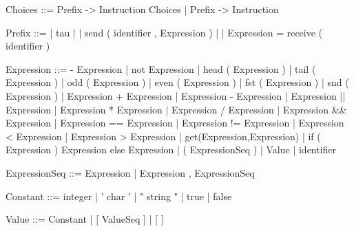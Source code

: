 \documentclass[11pt]{report}
\begin{document}
\begin{verbnobox}[\normalfont]
Choices ::= Prefix -> { Instruction } Choices | Prefix -> { Instruction }
\end{verbnobox}
\vspace*{3pt}

\begin{verbnobox}[\normalfont]
Prefix ::= | tau
         | | send ( identifier , Expression )
         | | Expression = receive ( identifier )
\end{verbnobox}
\vspace*{3pt}

\begin{verbnobox}[\normalfont]
Expression ::= - Expression
               | not Expression
               | head ( Expression )
               | tail ( Expression )
               | odd ( Expression )
               | even ( Expression )
               | fst ( Expression )
               | snd ( Expression )
               | Expression + Expression
               | Expression - Expression
               | Expression || Expression
               | Expression * Expression
               | Expression / Expression
               | Expression && Expression
               | Expression == Expression
               | Expression != Expression 
               | Expression < Expression
               | Expression > Expression
               | get(Expression,Expression)
               | if ( Expression ) { Expression } else { Expression }
               | ( ExpressionSeq )
               | Value
               | identifier
\end{verbnobox}
\vspace*{3pt}

\begin{verbnobox}[\normalfont]
ExpressionSeq ::= Expression | Expression , ExpressionSeq
\end{verbnobox}
\vspace*{3pt}

\begin{verbnobox}[\normalfont]
Constant ::= integer
             | ' char '
             | " string "
             | true
             | false
\end{verbnobox}
\vspace*{3pt}

\begin{verbnobox}[\normalfont]
Value ::= Constant | [ ValueSeq ] | [ ]
\end{verbnobox}
\vspace*{3pt}
\end{document}
